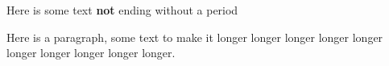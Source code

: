Here is some text \textbf{not} ending without a period 

Here is a paragraph, some text to make it longer longer longer longer longer
longer longer longer longer longer.
